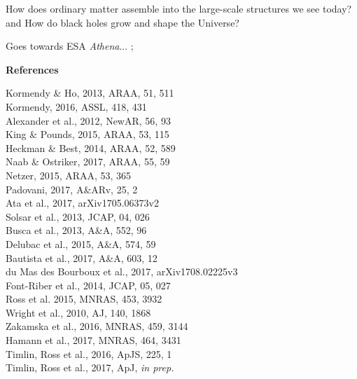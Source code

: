 \documentclass[oneside, a4paper, onecolumn, 11pt]{article}
\begin{document}
How does ordinary matter assemble into the large-scale structures we see today? and
How do black holes grow and shape the Universe?

Goes towards ESA {\it Athena}... ; 





\newpage
\begin{center}
\medskip
 \medskip
 {\large \bf References}
    \vspace{-10pt}
\end{center}
\begin{multicols}{2}[]
\noindent
{}\rbrack Kormendy \& Ho, 2013, ARAA, 51, 511\\
\rbrack Kormendy,  2016, ASSL, 418, 431\\
\rbrack Alexander et al., 2012, NewAR, 56, 93\\
\rbrack King \& Pounds, 2015, ARAA, 53, 115 \\
\rbrack Heckman \& Best, 2014, ARAA, 52, 589\\
\rbrack Naab \& Ostriker, 2017, ARAA, 55, 59 \\
\rbrack Netzer, 2015, ARAA, 53,  365\\
\rbrack Padovani, 2017, A\&ARv, 25, 2\\
\rbrack Ata et al., 2017, arXiv1705.06373v2\\
\rbrack Solsar et al., 2013, JCAP, 04, 026 \\
\rbrack Busca et al.,  2013, A\&A, 552, 96 \\
\rbrack Delubac et al.,  2015, A\&A, 574, 59 \\
\rbrack Bautista et al., 2017, A\&A, 603, 12 \\
\rbrack du Mas des Bourboux et al., 2017, arXiv1708.02225v3\\
\rbrack Font-Riber et al., 2014, JCAP, 05, 027\\
\rbrack Ross et al. 2015, MNRAS, 453, 3932\\
\rbrack Wright et al., 2010, AJ, 140, 1868\\
\rbrack Zakamska et al., 2016, MNRAS, 459, 3144\\
\rbrack Hamann et al., 2017, MNRAS, 464, 3431\\
\rbrack Timlin, Ross et al., 2016, ApJS, 225, 1\\
\rbrack Timlin, Ross et al., 2017, ApJ, {\it in prep.}\\

\end{multicols}
\end{document}
